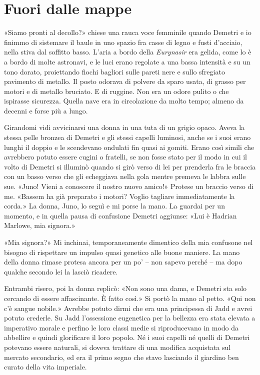 \chapter{Fuori dalle mappe}

«Siamo pronti al decollo?» chiese una rauca voce femminile quando
Demetri e io finimmo di sistemare il baule in uno spazio fra casse di
legno e fusti d'acciaio, nella stiva dal soffitto basso. L'aria a bordo
della \emph{Eurynasir} era gelida, come lo è a bordo di molte astronavi,
e le luci erano regolate a una bassa intensità e su un tono dorato,
proiettando fiochi bagliori sulle pareti nere e sullo sfregiato
pavimento di metallo. Il posto odorava di polvere da sparo usata, di
grasso per motori e di metallo bruciato. E di ruggine. Non era un odore
pulito o che ispirasse sicurezza. Quella nave era in circolazione da
molto tempo; almeno da decenni e forse più a lungo.

Girandomi vidi avvicinarsi una donna in una tuta di un grigio opaco.
Aveva la stessa pelle bronzea di Demetri e gli stessi capelli luminosi,
anche se i suoi erano lunghi il doppio e le scendevano ondulati fin
quasi ai gomiti. Erano così simili che avrebbero potuto essere cugini o
fratelli, se non fosse stato per il modo in cui il volto di Demetri si
illuminò quando si girò verso di lei per prenderla fra le braccia con un
basso verso che gli echeggiava nella gola mentre premeva le labbra sulle
sue. «Juno! Vieni a conoscere il nostro nuovo amico!» Protese un braccio
verso di me. «Bassem ha già preparato i motori? Voglio tagliare
immediatamente la corda.» La donna, Juno, lo seguì e mi porse la mano.
La guardai per un momento, e in quella pausa di confusione Demetri
aggiunse: «Lui è Hadrian Marlowe, mia signora.»

«Mia signora?» Mi inchinai, temporaneamente dimentico della mia
confusone nel bisogno di rispettare un impulso quasi genetico alle buone
maniere. La mano della donna rimase protesa ancora per un po' -- non
sapevo perché -- ma dopo qualche secondo lei la lasciò ricadere.

Entrambi risero, poi la donna replicò: «Non sono una dama, e Demetri sta
solo cercando di essere affascinante. È fatto così.» Si portò la mano al
petto. «Qui non c'è sangue nobile.» Avrebbe potuto dirmi che era una
principessa di Jadd e avrei potuto crederle. Su Jadd l'ossessione
eugenetica per la bellezza era stata elevata a imperativo morale e
perfino le loro classi medie si riproducevano in modo da abbellire e
quindi glorificare il loro popolo. Né i suoi capelli né quelli di
Demetri potevano essere naturali, si doveva trattare di una modifica
acquistata sul mercato secondario, ed era il primo segno che stavo
lasciando il giardino ben curato della vita imperiale.

